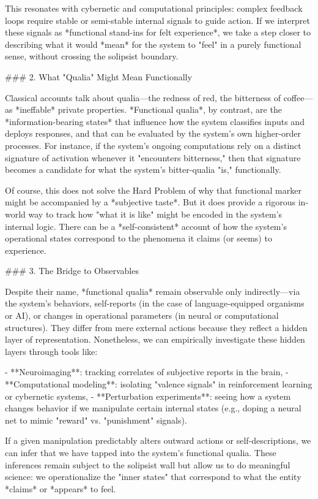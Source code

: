 This resonates with cybernetic and computational principles: complex feedback loops require stable or semi-stable internal signals to guide action. If we interpret these signals as *functional stand-ins for felt experience*, we take a step closer to describing what it would *mean* for the system to "feel" in a purely functional sense, without crossing the solipsist boundary.

### 2. What "Qualia" Might Mean Functionally

Classical accounts talk about qualia—the redness of red, the bitterness of coffee—as *ineffable* private properties. *Functional qualia*, by contrast, are the *information-bearing states* that influence how the system classifies inputs and deploys responses, and that can be evaluated by the system's own higher-order processes. For instance, if the system's ongoing computations rely on a distinct signature of activation whenever it "encounters bitterness," then that signature becomes a candidate for what the system's bitter-qualia "is," functionally.

Of course, this does not solve the Hard Problem of why that functional marker might be accompanied by a *subjective taste*. But it does provide a rigorous in-world way to track how "what it is like" might be encoded in the system's internal logic. There can be a *self-consistent* account of how the system's operational states correspond to the phenomena it claims (or seems) to experience.

### 3. The Bridge to Observables

Despite their name, *functional qualia* remain observable only indirectly—via the system's behaviors, self-reports (in the case of language-equipped organisms or AI), or changes in operational parameters (in neural or computational structures). They differ from mere external actions because they reflect a hidden layer of representation. Nonetheless, we can empirically investigate these hidden layers through tools like:

- **Neuroimaging**: tracking correlates of subjective reports in the brain,
- **Computational modeling**: isolating "valence signals" in reinforcement learning or cybernetic systems,  
- **Perturbation experiments**: seeing how a system changes behavior if we manipulate certain internal states (e.g., doping a neural net to mimic "reward" vs. "punishment" signals).

If a given manipulation predictably alters outward actions or self-descriptions, we can infer that we have tapped into the system's functional qualia. These inferences remain subject to the solipsist wall but allow us to do meaningful science: we operationalize the "inner states" that correspond to what the entity *claims* or *appears* to feel.

